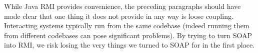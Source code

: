 While Java RMI provides convenience, the preceding paragraphs
should have made clear that one thing it does not provide in any way
is loose coupling. Interacting systems typically run from the same
codebase (indeed running them from different codebases can pose
significant problems). By trying to turn SOAP into RMI, we risk losing
the very things we turned to SOAP for in the first place.






